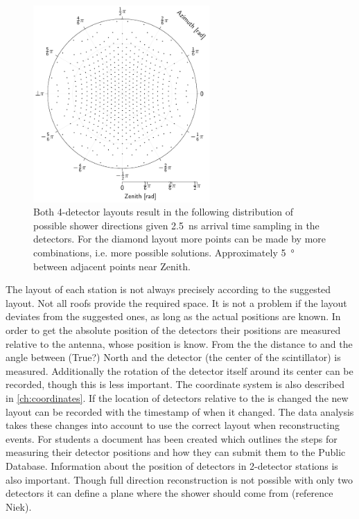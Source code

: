 \begin{figure}
    \centering
    \includegraphics[width=0.6\textwidth]
                    {plots/station/discrete_directions}
    \caption{Both 4-detector layouts result in the following distribution of possible shower directions given \SI{2.5}{\ns} arrival time sampling in the detectors. For the diamond layout more points can be made by more combinations, i.e. more possible solutions. Approximately \SI{5}{\degree} between adjacent points near Zenith.}
    \label{fig:discrete_directions}
\end{figure}

The layout of each station is not always precisely according to the suggested layout. Not all roofs provide the required space. It is not a problem if the layout deviates from the suggested ones, as long as the actual positions are known. In order to get the absolute position of the detectors their positions are measured relative to the \gps antenna, whose position is know. From the \gps the distance to and the angle between (True?) North and the detector (the center of the scintillator) is measured. Additionally the rotation of the detector itself around its center can be recorded, though this is less important. The coordinate system is also described in \cref{ch:coordinates}. If the location of detectors relative to the \gps is changed the new layout can be recorded with the timestamp of when it changed. The data analysis takes these changes into account to use the correct layout when reconstructing events. For students a document has been created which outlines the steps for measuring their detector positions and how they can submit them to the Public Database. Information about the position of detectors in 2-detector stations is also important. Though full direction reconstruction is not possible with only two detectors it can define a plane where the shower should come from (reference Niek).

